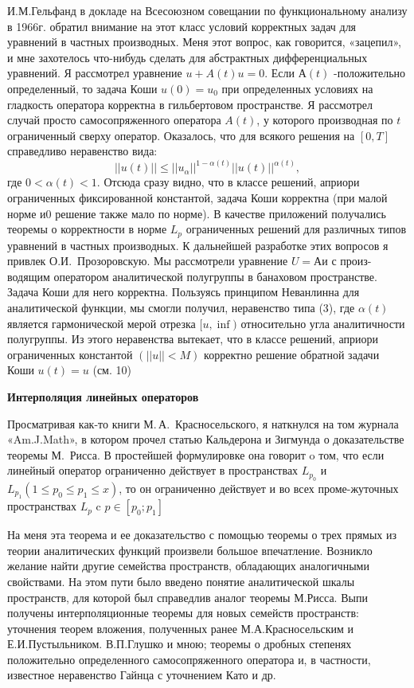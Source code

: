И.М.Гельфанд в докладе на Всесоюзном совещании по функциональному анализу в 1966г. обратил внимание на этот класс условий корректных задач для уравнений в частных производных. Меня этот вопрос, как говорится, «зацепил», и мне захотелось что-нибудь сделать для абстрактных дифференциальных уравнений. Я рассмотрел уравнение $u + A(t)u = 0$. Если $А(t)$ -положительно определенный, то задача Коши $u(0)=u_0$ при определенных условиях на гладкость оператора корректна в гильбертовом пространстве. Я рассмотрел случай просто самосопряженного оператора $A(t)$, у которого производная по $t$ ограниченный сверху оператор. Оказалось, что для всякого решения на $[0,T]$ справедливо неравенство вида:
$$||u(t)||\leq||u_{\alpha}||^{1-\alpha(t)} ||u(t)||^{\alpha(t)},$$
где $0<\alpha(t) < 1$.
Отсюда сразу видно, что в классе решений, априори ограниченных фиксированной константой,
задача Коши корректна (при малой норме и0 решение также мало по норме).
В качестве приложений получались теоремы о корректности в норме $L_p$
ограниченных решений для различных типов уравнений в частных производных.
К дальнейшей разработке этих вопросов я привлек О.И.~Прозоровскую. Мы рассмотрели уравнение $U = Аи$ с произ-водящим оператором аналитической полугруппы в банаховом пространстве. Задача Коши для него корректна. Пользуясь принципом Неванлинна для аналитической функции, мы смогли получил, неравенство типа (3), где $\alpha(t)$
является гармонической мерой отрезка $[u, \inf)$  относительно угла аналитичности полугруппы. Из этого неравенства вытекает, что в классе решений, априори ограниченных константой $(||u||<M)$ корректно решение обратной задачи Коши $u(t) = u$ (см. 10)

{\bf Интерполяция линейных операторов}

Просматривая как-то книги М.\,А.~Красносельского, я наткнулся на том журнала «Am.J.Math»,
в котором прочел статью Кальдерона и Зигмунда о доказательстве теоремы М.~Рисса.
В простейшей формулировке она говорит o том, что если линейный оператор ограниченно действует в пространствах $L_{p_0}$ и  $L_{p_1} (1\leq p_0 \leq p_1 \leq x)$, то он ограниченно действует и во всех проме-жуточных пространствах $L_p$ c $p \in [p_0;p_1]$

На меня эта теорема и ее доказательство с помощью теоремы о трех прямых из теории аналитических функций произвели большое впечатление. Возникло желание найти другие семейства пространств, обладающих аналогичными свойствами. На этом пути было введено понятие аналитической шкалы пространств, для которой был справедлив аналог теоремы М.Рисса. Выпи получены интерполяционные теоремы для новых семейств пространств: уточнения теорем вложения, полученных ранее М.А.Красносельским и Е.И.Пустыльником. В.П.Глушко и мною; теоремы о дробных степенях положительно определенного самосопряженного оператора и, в частности, известное неравенство Гайнца с уточнением Като и др.

